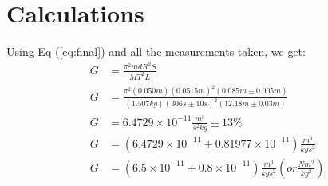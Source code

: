 \documentclass[12pt]{article}
\begin{document}
\newpage
    \section*{Calculations}
    Using Eq (\ref{eq:final}) and all the measurements taken, we get:
    \begin{equation*}
        \begin{aligned}
            G&=\frac{\pi^2mdR^2S}{MT^2L}\\
            G&=\frac{\pi^2(0.050m)(0.0515m)^2(0.085\si{m} \pm 0.005\si{m})}{(1.507kg)(306\si{s} \pm 10\si{s})^2(12.18\si{m} \pm 0.03 \si{m})}\\
            G&=6.4729 \times 10^{-11}\frac{\si{m^3}}{\si{s^2kg}}\pm 13\% \\
            G&=(6.4729 \times 10^{-11}\pm 0.81977 \times 10^{-11})\frac{\si{m^3}}{\si{kgs^2}}\\
            G&=(6.5 \times 10^{-11}\pm 0.8 \times 10^{-11})\frac{\si{m^3}}{\si{kgs^2}}( or \frac{\si{Nm^2}}{\si{kg^2}} )\\
        \end{aligned}
    \end{equation*}



   
\end{document}
